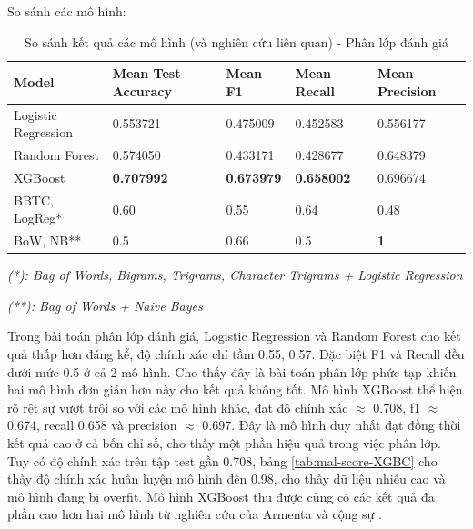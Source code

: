     So sánh các mô hình:

    \begin{table}[htbp]
        \centering
        \caption{So sánh kết quả các mô hình (và nghiên cứu liên quan) - Phân lớp đánh giá}
        \label{tab:mal-score-compare}
        \begin{tabular}{|p{2cm}|p{2cm}|p{2cm}|p{2cm}|p{2cm}|}
            \hline
             Model & Mean Test Accuracy & Mean F1 & Mean Recall & Mean Precision\\
            \hline
            Logistic Regression & 0.553721 & 0.475009 & 0.452583 & 0.556177 \\
            \hline
            Random Forest & 0.574050 & 0.433171 & 0.428677 & 0.648379 \\
            \hline
            XGBoost & \textbf{0.707992} & \textbf{0.673979} & \textbf{0.658002} & 0.696674 \\
            \hline
             BBTC, LogReg* \cite{armenta2023anime} & 0.60 & 0.55 & 0.64  &  0.48  \\
            \hline
            BoW, NB** \cite{armenta2023anime} & 0.5 & 0.66 & 0.5  &  \textbf{1}  \\
            \hline
        \end{tabular}
    \end{table}

    \FloatBarrier

    \textit{(*): Bag of Words, Bigrams, Trigrams, Character Trigrams + Logistic Regression}

    \textit{(**): Bag of Words + Naive Bayes}

    Trong bài toán phân lớp đánh giá, Logistic Regression và Random Forest cho kết quả thấp hơn đáng kể, độ chính xác chỉ tầm 0.55, 0.57. Dặc biệt F1 và Recall đều dưới mức 0.5 ở cả 2 mô hình. Cho thấy đây là bài toán phân lớp phức tạp khiến hai mô hình đơn giản hơn này cho kết quả không tốt. Mô hình XGBoost thể hiện rõ rệt sự vượt trội so với các mô hình khác, đạt độ chính xác $\approx$ 0.708, f1 $\approx$ 0.674, recall 0.658 và precision $\approx$ 0.697. Đây là mô hình duy nhất đạt đồng thời kết quả cao ở cả bốn chỉ số, cho thấy một phần hiệu quả trong việc phân lớp. Tuy có độ chính xác trên tập test gần 0.708, bảng \ref{tab:mal-score-XGBC} cho thấy độ chính xác huấn luyện mô hình đến 0.98, cho thấy dữ liệu nhiễu cao và mô hình đang bị overfit. Mô hình XGBoost thu được cũng có các kết quả đa phần cao hơn hai mô hình từ nghiên cứu của Armenta và cộng sự \cite{armenta2023anime}.

